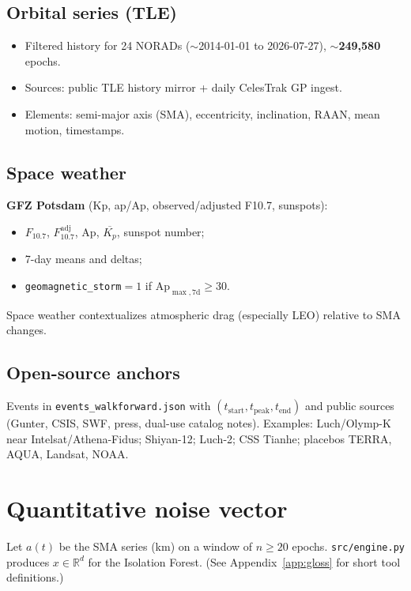\documentclass[11pt,a4paper]{article}
\begin{document}
\subsection{Orbital series (TLE)}
\begin{itemize}[leftmargin=*]
  \item Filtered history for 24 NORADs ($\sim$2014-01-01 to 2026-07-27), $\sim$\textbf{249{,}580} epochs.
  \item Sources: public TLE history mirror + daily CelesTrak GP ingest.
  \item Elements: semi-major axis (SMA), eccentricity, inclination, RAAN, mean motion, timestamps.
\end{itemize}

\subsection{Space weather}
\textbf{GFZ Potsdam} (Kp, ap/Ap, observed/adjusted F10.7, sunspots):
\begin{itemize}[leftmargin=*]
  \item \(F_{10.7}\), \(F_{10.7}^{\mathrm{adj}}\), \(\mathrm{Ap}\), \(\overline{K_p}\), sunspot number;
  \item 7-day means and deltas;
  \item \texttt{geomagnetic\_storm}$=1$ if \(\mathrm{Ap}_{\max,7\mathrm{d}}\ge 30\).
\end{itemize}
Space weather contextualizes atmospheric drag (especially LEO) relative to SMA changes.

\subsection{Open-source anchors}
Events in \texttt{events\_walkforward.json} with \((t_{\mathrm{start}}, t_{\mathrm{peak}}, t_{\mathrm{end}})\) and public sources (Gunter, CSIS, SWF, press, dual-use catalog notes). Examples: Luch/Olymp-K near Intelsat/Athena-Fidus; Shiyan-12; Luch-2; CSS Tianhe; placebos TERRA, AQUA, Landsat, NOAA.

\section{Quantitative noise vector}
\label{sec:math}

Let \(a(t)\) be the SMA series (km) on a window of \(n\ge 20\) epochs.
\texttt{src/engine.py} produces \(x\in\mathbb{R}^{d}\) for the Isolation Forest.
(See Appendix~\ref{app:gloss} for short tool definitions.)
\end{document}
